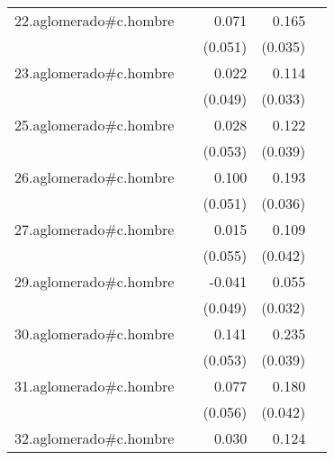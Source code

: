 {\begin{longtable}{l*{4}{D{.}{.}{-1}}}
\addlinespace
22.aglomerado#c.hombre&                     &       0.071         &       0.165\sym{***}&                     \\
            &                     &     (0.051)         &     (0.035)         &                     \\
\addlinespace
23.aglomerado#c.hombre&                     &       0.022         &       0.114\sym{***}&                     \\
            &                     &     (0.049)         &     (0.033)         &                     \\
\addlinespace
25.aglomerado#c.hombre&                     &       0.028         &       0.122\sym{**} &                     \\
            &                     &     (0.053)         &     (0.039)         &                     \\
\addlinespace
26.aglomerado#c.hombre&                     &       0.100         &       0.193\sym{***}&                     \\
            &                     &     (0.051)         &     (0.036)         &                     \\
\addlinespace
27.aglomerado#c.hombre&                     &       0.015         &       0.109\sym{**} &                     \\
            &                     &     (0.055)         &     (0.042)         &                     \\
\addlinespace
29.aglomerado#c.hombre&                     &      -0.041         &       0.055         &                     \\
            &                     &     (0.049)         &     (0.032)         &                     \\
\addlinespace
30.aglomerado#c.hombre&                     &       0.141\sym{**} &       0.235\sym{***}&                     \\
            &                     &     (0.053)         &     (0.039)         &                     \\
\addlinespace
31.aglomerado#c.hombre&                     &       0.077         &       0.180\sym{***}&                     \\
            &                     &     (0.056)         &     (0.042)         &                     \\
\addlinespace
32.aglomerado#c.hombre&                     &       0.030         &       0.124\sym{***}&                     \\

\end{longtable}}
